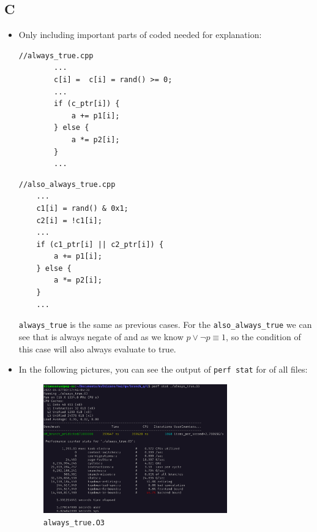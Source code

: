 \documentclass[12pt]{article}
\begin{document}
	\subsection{C}
	\begin{itemize}
			\item 
	Only including important parts of coded needed for explanation:
	
	\begin{lstlisting}[style=CStyle]
		//always_true.cpp
		...
		c[i] =  c[i] = rand() >= 0;
		...
		if (c_ptr[i]) {
			a += p1[i];
		} else {
			a *= p2[i];
		}
		...
	\end{lstlisting}

	\begin{lstlisting}[style=CStyle]
	//also_always_true.cpp
	...
 	c1[i] = rand() & 0x1;
	c2[i] = !c1[i];
	...
	if (c1_ptr[i] || c2_ptr[i]) {
		a += p1[i];
	} else {
		a *= p2[i];
	}
	...
\end{lstlisting}

\Verb+always_true+ is the same as previous cases. For the \Verb+also_always_true+ we can see that  is always negate of  and as we know $p \lor \neg p \equiv 1$, so the  condition of this case will also always evaluate to true.

\item 

In the following pictures, you can see the output of \Verb+perf stat+ for of all files:

\begin{figure}[H]
	\centering
	\includegraphics[width=0.75\textwidth]{./images/4C/always-true.png}	
	\cprotect\caption{\Verb+always_true.O3+}
\end{figure}



\end{itemize}
\end{document}
